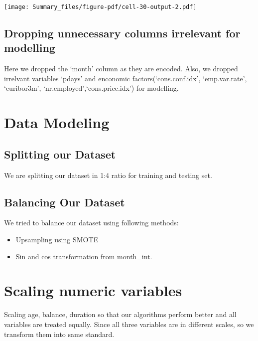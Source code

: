 \documentclass[
  letterpaper,
  DIV=11,
  numbers=noendperiod]{scrartcl}
\providecommand{\tightlist}{%
  \setlength{\itemsep}{0pt}\setlength{\parskip}{0pt}}\usepackage{longtable,booktabs,array}
\begin{document}
\texttt{[image: Summary\_files/figure-pdf/cell-30-output-2.pdf]}

\hypertarget{dropping-unnecessary-columns-irrelevant-for-modelling}{%
\subsection{Dropping unnecessary columns irrelevant for
modelling}\label{dropping-unnecessary-columns-irrelevant-for-modelling}}

Here we dropped the `month' column as they are encoded. Also, we dropped
irrelvant variables `pdays' and enconomic factors(`cons.conf.idx',
`emp.var.rate', `euribor3m', `nr.employed',`cons.price.idx') for
modelling.

\hypertarget{data-modeling}{%
\section{Data Modeling}\label{data-modeling}}

\hypertarget{splitting-our-dataset}{%
\subsection{Splitting our Dataset}\label{splitting-our-dataset}}

We are splitting our dataset in 1:4 ratio for training and testing set.

\hypertarget{balancing-our-dataset}{%
\subsection{Balancing Our Dataset}\label{balancing-our-dataset}}

We tried to balance our dataset using following methods:

\begin{itemize}
\tightlist
\item
  Upsampling using SMOTE
\item
  Sin and cos transformation from month\_int.
\end{itemize}

\hypertarget{scaling-numeric-variables}{%
\section{Scaling numeric variables}\label{scaling-numeric-variables}}

Scaling age, balance, duration so that our algorithms perform better and
all variables are treated equally. Since all three variables are in
different scales, so we transform them into same standard.
\end{document}
